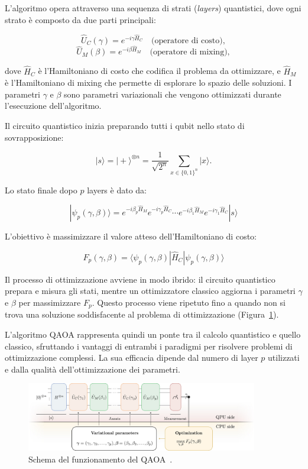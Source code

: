 L'algoritmo opera attraverso una sequenza di strati (\textit{layers}) quantistici, 
dove ogni strato è composto da due parti principali:

\begin{equation}
   \hat{U}_C(\gamma) = e^{-i\gamma \hat{H}_C} \quad \text{(operatore di costo)},
\end{equation}
\begin{equation}    
   \hat{U}_M(\beta) = e^{-i\beta \hat{H}_M} \quad \text{(operatore di mixing)},
\end{equation}

dove $\hat{H}_C$ è l'Hamiltoniano di costo che codifica il problema da ottimizzare, 
e $\hat{H}_M$ è l'Hamiltoniano di mixing che permette di esplorare lo spazio delle 
soluzioni. I parametri $\gamma$ e $\beta$ sono parametri variazionali che vengono 
ottimizzati durante l'esecuzione dell'algoritmo.

Il circuito quantistico inizia preparando tutti i qubit nello stato di sovrapposizione:

\begin{equation}
   |s\rangle = |+\rangle^{\otimes n} = \frac{1}{\sqrt{2^n}}\sum_{x\in\{{0,1\}}^n} |x\rangle.
\end{equation}

Lo stato finale dopo $p$ layers è dato da:

\begin{equation}
   |\psi_p(\gamma, \beta)\rangle = e^{-i\beta_p \hat{H}_M} e^{-i\gamma_p \hat{H}_C} \cdots e^{-i\beta_1 \hat{H}_M} e^{-i\gamma_1 \hat{H}_C} |s\rangle
\end{equation}

L'obiettivo è massimizzare il valore atteso dell'Hamiltoniano di costo:

\begin{equation}
   F_p(\gamma, \beta) = \langle\psi_p(\gamma, \beta)| \hat{H}_C |\psi_p(\gamma, \beta)\rangle
\end{equation}

Il processo di ottimizzazione avviene in modo ibrido: il circuito quantistico prepara e 
misura gli stati, mentre un ottimizzatore classico aggiorna i parametri $\gamma$ e $\beta$ 
per massimizzare $F_p$. Questo processo viene ripetuto fino a quando non si trova una 
soluzione soddisfacente al problema di ottimizzazione (Figura~\ref{fig:circuitoQAOA}).

L'algoritmo QAOA rappresenta quindi un ponte tra il calcolo quantistico e quello classico, 
sfruttando i vantaggi di entrambi i paradigmi per risolvere problemi di ottimizzazione 
complessi. La sua efficacia dipende dal numero di layer $p$ utilizzati e dalla qualità 
dell'ottimizzazione dei parametri.


\begin{figure}[h!]
    \centering
    \includegraphics[width=0.9\textwidth]{images/qaoa.jpg}
    \caption{Schema del funzionamento del QAOA~\cite{blekos2024review}.}
    \label{fig:circuitoQAOA}
\end{figure}